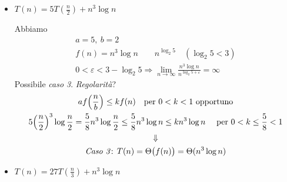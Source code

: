 \begin{itemize}[label=$\bullet$]
    \item $T(n) = 5T(\frac{n}{2}) + n^3 \log n$ \par
    Abbiamo 
    \begin{gather*}
        a = 5, \ b = 2 \\
        f(n) = n^3 \log n \qquad n^{\log_2 5} \quad (\log_2 5 < 3) \\
        0 < \varepsilon < 3 - \log_2 5 \Rightarrow
            \lim_{n \to \infty} \frac{n^3 \log n}{n^{\log_2 5 + \varepsilon}} = \infty
    \end{gather*}
    Possibile \emph{caso 3}. \emph{Regolarità}?
    \begin{gather*}
        af\Big(\frac{n}{b}\Big) \leq kf(n) \quad \text{per } 0 < k < 1 \text{ opportuno} \\
        5 \Big(\frac{n}{2}\Big)^3 \log \frac{n}{2} = \frac{5}{8}n^3 \log \frac{n}{2} 
            \leq \frac{5}{8} n^3 \log n \leq kn^3 \log n \quad \text{ per } 0 < k \leq \frac{5}{8} < 1 \\
            \Downarrow \\
            \text{\emph{Caso 3}: } T(n) = \Theta \big(f(n)\big) = \Theta(n^3 \log n)
    \end{gather*}

    \item $T(n) = 27T(\frac{n}{3}) + n^3 \log n$ 
\end{itemize}

